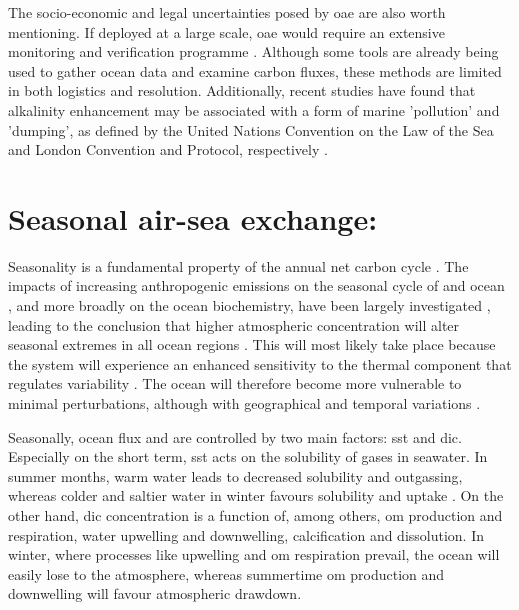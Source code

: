 The socio-economic and legal uncertainties posed by \ac{oae} are also worth mentioning. If deployed at a large scale, \ac{oae} would require an extensive monitoring and verification programme \citep{ho2023chapter}. Although some tools are already being used to gather ocean data and examine carbon fluxes, these methods are limited in both logistics and resolution. Additionally, recent studies have found that alkalinity enhancement may be associated with a form of marine 'pollution' and 'dumping', as defined by the United Nations Convention on the Law of the Sea and London Convention and Protocol, respectively \citep{NAP26278}.

\section{Seasonal air-sea  exchange:}

Seasonality is a fundamental property of the annual net carbon cycle \citep{rodgers2023seasonal, fassbender2022quantifying}. The impacts of increasing anthropogenic emissions on the seasonal cycle of  and ocean , and more broadly on the ocean biochemistry, have been largely investigated \citep{lerner2021drivers, landschutzer2018strengthening, kwiatkowski2018diverging}, leading to the conclusion that higher atmospheric  concentration will alter seasonal extremes in all ocean regions \citep{landschutzer2018strengthening}. This will most likely take place because the system will experience an enhanced sensitivity to the thermal component that regulates  variability \citep{mcneil2019changing}. The ocean will therefore become more vulnerable to minimal perturbations, although with geographical and temporal variations \citep{landschutzer2018strengthening, egleston2010revelle}.

Seasonally, ocean  flux and  are controlled by two main factors: \ac{sst} and \ac{dic}. Especially on the short term, \ac{sst} acts on the solubility of gases in seawater. In summer months, warm water leads to decreased solubility and  outgassing, whereas colder and saltier water in winter favours solubility and  uptake \citep{williams2011ocean}. On the other hand, \ac{dic} concentration is a function of, among others, \ac{om} production and respiration, water upwelling and downwelling, calcification and dissolution. In winter, where processes like upwelling and \ac{om} respiration prevail, the ocean will easily lose  to the atmosphere, whereas summertime \ac{om} production and downwelling will favour atmospheric  drawdown.

